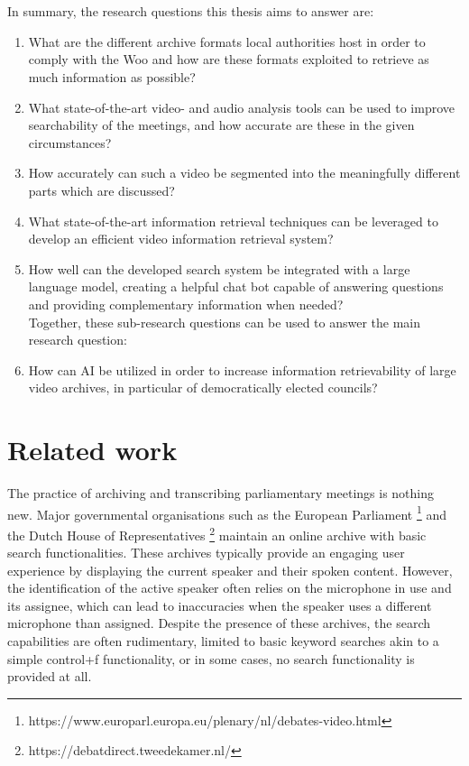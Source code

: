 \documentclass[twoside]{uva-inf-bachelor-thesis}
\begin{document}
\\\\
In summary, the research questions this thesis aims to answer are:
\begin{enumerate}
    \item What are the different archive formats local authorities host in order to comply with the Woo and how are these formats exploited to retrieve as much information as possible?
    \item What state-of-the-art video- and audio analysis tools can be used to improve searchability of the meetings, and how accurate are these in the given circumstances?
    \item How accurately can such a video be segmented into the meaningfully different parts which are discussed?
    \item What state-of-the-art information retrieval techniques can be leveraged to develop an efficient video information retrieval system?
    \item How well can the developed search system be integrated with a large language model, creating a helpful chat bot capable of answering questions and providing complementary information when needed?
    \\
    
    Together, these sub-research questions can be used to answer the main research question:
    \item How can AI be utilized in order to increase information retrievability of large video archives, in particular of democratically elected councils?
\end{enumerate}


\chapter{Related work}
The practice of archiving and transcribing parliamentary meetings is nothing new. Major governmental organisations such as the European Parliament \footnote{https://www.europarl.europa.eu/plenary/nl/debates-video.html} and the Dutch House of Representatives \footnote{https://debatdirect.tweedekamer.nl/} maintain an online archive with basic search functionalities. 
These archives typically provide an engaging user experience by displaying the current speaker and their spoken content. However, the identification of the active speaker often relies on the microphone in use and its assignee, which can lead to inaccuracies when the speaker uses a different microphone than assigned.
Despite the presence of these archives, the search capabilities are often rudimentary, limited to basic keyword searches akin to a simple control+f functionality, or in some cases, no search functionality is provided at all.
\end{document}
